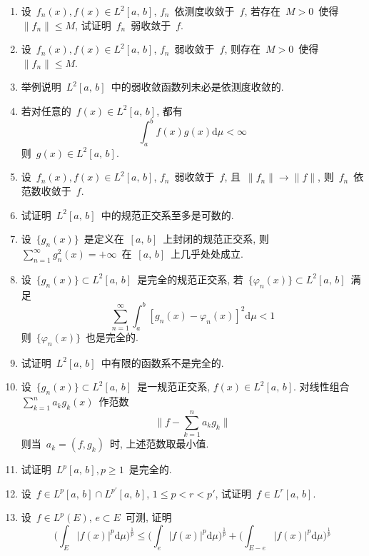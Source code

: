 \begin{enumerate}

\item 设~$f_{n}(x), f(x)\in L^2[a,\,b]$, $f_{n}$~依测度收敛于~$f$, 若存在~$M>0$~使得~$\|f_{n}\|\leqslant M$, 试证明~$f_{n}$~弱收敛于~$f$.

\item 设~$f_{n}(x), f(x)\in L^2[a,\,b]$, $f_{n}$~弱收敛于~$f$, 则存在~$M>0$~使得~$\|f_{n}\|\leqslant M$.

\item 举例说明~$L^2[a,\,b]$~中的弱收敛函数列未必是依测度收敛的.

\item 若对任意的~$f(x)\in L^2[a,\,b]$, 都有
\[
\int_{a}^{b}f(x)g(x)\mathrm{d}\mu<\infty
\]
则~$g(x) \in L^2[a,\,b]$.

\item 设~$f_{n}(x), f(x)\in L^2[a,\,b]$, $f_{n}$~弱收敛于~$f$, 且~$\|f_{n}\|\rightarrow \|f\|$, 则~$f_{n}$~依范数收敛于~$f$.

\item 试证明~$L^2[a,\,b]$~中的规范正交系至多是可数的.

\item 设~$\{g_{n}(x)\}$~是定义在~$\left[a,\,b\right]$~上封闭的规范正交系, 则~$\sum\limits_{n=1}^{\infty}g_{n}^{2}(x)=+\infty$~在~$\left[a,\,b\right]$~上几乎处处成立.


\item 设~$\{g_{n}(x)\}\subset L^2[a,\,b]$~是完全的规范正交系, 若~$\{\varphi_{n}(x)\}\subset L^2[a,\,b]$~满足
\[
\sum_{n=1}^{\infty}\int_{a}^{b}[g_{n}(x)-\varphi_{n}(x)]^{2}\mathrm{d}\mu<1
\]
则~$\{\varphi_{n}(x)\}$~也是完全的.

\item 试证明~$L^2[a,\,b]$~中有限的函数系不是完全的.

\item 设~$\{g_{n}(x)\}\subset L^2[a,\,b]$~是一规范正交系, $f(x)\in L^2[a,\,b]$. 对线性组合~$\sum\limits_{k=1}^{n}a_{k}g_{k}(x)$~作范数
\[
\Big\|f-\sum_{k=1}^{n}a_{k}g_{k}\Big\|
\]
则当~$a_{k}=(f,g_{k})$~时, 上述范数取最小值.

\item 试证明~$L^p[a,\,b], p\geqslant 1$~是完全的.

\item 设~$f\in L^p[a,\,b]\cap L^{p'}\left[a,\,b\right]$, $1\leqslant p<r<p'$, 试证明~$f\in L^{r}\left[a,\,b\right]$.

\item 设~$f \in L^p(E)$, $e \subset E$~可测, 证明
\[
\Big( \int_E |f(x)|^p \mathrm{d} \mu \Big)^\frac{1}{p} \leqslant \Big( \int_e |f(x)|^p \mathrm{d} \mu \Big)^\frac{1}{p} + \Big( \int_{E-e} |f(x)|^p \mathrm{d} \mu \Big)^\frac{1}{p}
\]


\end{enumerate}
